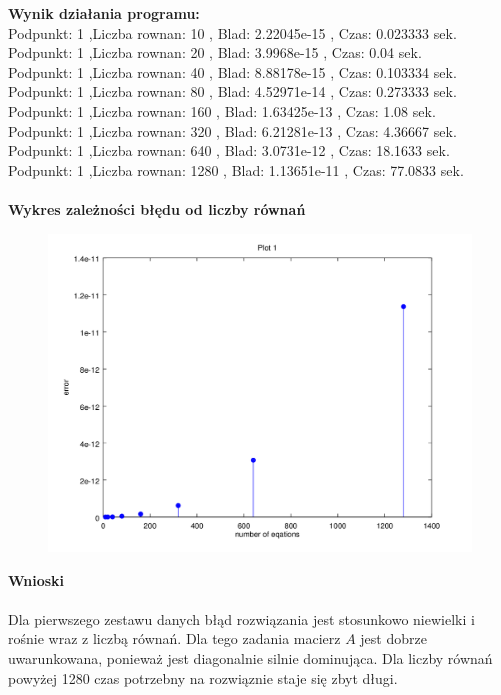 \documentclass[a4paper, 11pt]{article}
\begin{document}
\textbf{Wynik działania programu:}\\
Podpunkt: 1 ,Liczba rownan: 10 , Blad: 2.22045e-15 , Czas: 0.023333 sek. \\
Podpunkt: 1 ,Liczba rownan: 20 , Blad: 3.9968e-15 , Czas: 0.04 sek. \\
Podpunkt: 1 ,Liczba rownan: 40 , Blad: 8.88178e-15 , Czas: 0.103334 sek. \\
Podpunkt: 1 ,Liczba rownan: 80 , Blad: 4.52971e-14 , Czas: 0.273333 sek. \\
Podpunkt: 1 ,Liczba rownan: 160 , Blad: 1.63425e-13 , Czas: 1.08 sek. \\
Podpunkt: 1 ,Liczba rownan: 320 , Blad: 6.21281e-13 , Czas: 4.36667 sek. \\
Podpunkt: 1 ,Liczba rownan: 640 , Blad: 3.0731e-12 , Czas: 18.1633 sek. \\
Podpunkt: 1 ,Liczba rownan: 1280 , Blad: 1.13651e-11 , Czas: 77.0833 sek.\\
\\
\vspace{11cm}
\textbf{Wykres zależności błędu od liczby równań}\\
\begin{figure}[th]
\includegraphics[width=\textwidth]{wykres1}
\end{figure}

\vspace{2cm}
\textbf{Wnioski}\\
\\
Dla pierwszego zestawu danych błąd rozwiązania jest stosunkowo niewielki i rośnie wraz z liczbą równań. 
Dla tego zadania macierz $A$ jest dobrze uwarunkowana, ponieważ jest diagonalnie silnie dominująca. Dla liczby równań powyżej 1280 czas potrzebny na  rozwiąznie staje się zbyt długi. 
\end{document}
